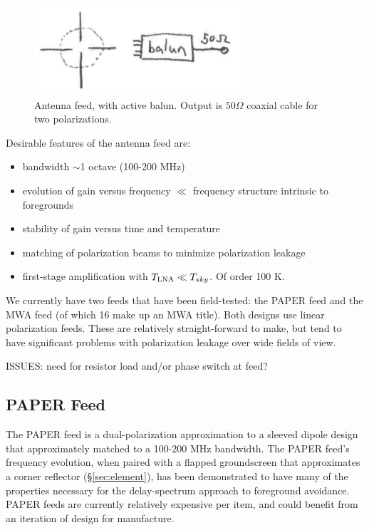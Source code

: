 \documentclass[11pt]{article}
\begin{document}
\begin{figure}
\centering
\includegraphics[width=3in]{plots/feed.png}
\caption{Antenna feed, with active balun.  Output is $50\Omega$ coaxial cable for two polarizations.}
\label{fig:feed}
\end{figure}

Desirable features of the antenna feed are:
\begin{itemize}
\item bandwidth $\sim$1 octave (100-200 MHz)
\item evolution of gain versus frequency $\ll$ frequency structure intrinsic to foregrounds
\item stability of gain versus time and temperature
\item matching of polarization beams to minimize polarization leakage
\item first-stage amplification with $T_{\rm LNA}\ll T_{sky}$. Of order 100 K.
\end{itemize}

We currently have two feeds that have been field-tested: the PAPER feed and the MWA feed (of which
16 make up an MWA title).  Both designs use linear polarization feeds.  These are relatively
straight-forward to make, but tend to have significant problems with polarization leakage
over wide fields of view.

ISSUES: need for resistor load and/or phase switch at feed?

\subsection{PAPER Feed}

The PAPER feed is a dual-polarization approximation to a sleeved dipole design that approximately matched
to a 100-200 MHz bandwidth.  The PAPER feed's frequency evolution, when paired with a flapped groundscreen
that approximates a corner reflector (\S\ref{sec:element}), has been demonstrated to have many of the properties
necessary for the delay-spectrum approach to foreground avoidance.  PAPER feeds are currently relatively expensive
per item, and could benefit from an iteration of design for manufacture.
\end{document}
